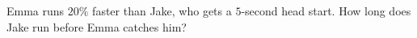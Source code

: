 Emma runs $20\%$ faster than Jake, who gets a $5$-second head start. How long does Jake run before Emma catches him?
